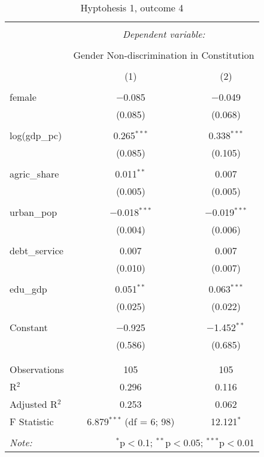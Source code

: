 \documentclass[12pt]{article}
\begin{document}
\begin{table}[!htbp] \centering 
  \caption{Hyptohesis 1, outcome 4} 
  \label{} 
\begin{tabular}{@{\extracolsep{5pt}}lcc} 
\\[-1.8ex]\hline 
\hline \\[-1.8ex] 
 & \multicolumn{2}{c}{\textit{Dependent variable:}} \\ 
\cline{2-3} 
\\[-1.8ex] & \multicolumn{2}{c}{Gender Non-discrimination in Constitution} \\ 
\\[-1.8ex] & (1) & (2)\\ 
\hline \\[-1.8ex] 
 female & $-$0.085 & $-$0.049 \\ 
  & (0.085) & (0.068) \\ 
  & & \\ 
 log(gdp\_pc) & 0.265$^{***}$ & 0.338$^{***}$ \\ 
  & (0.085) & (0.105) \\ 
  & & \\ 
 agric\_share & 0.011$^{**}$ & 0.007 \\ 
  & (0.005) & (0.005) \\ 
  & & \\ 
 urban\_pop & $-$0.018$^{***}$ & $-$0.019$^{***}$ \\ 
  & (0.004) & (0.006) \\ 
  & & \\ 
 debt\_service & 0.007 & 0.007 \\ 
  & (0.010) & (0.007) \\ 
  & & \\ 
 edu\_gdp & 0.051$^{**}$ & 0.063$^{***}$ \\ 
  & (0.025) & (0.022) \\ 
  & & \\ 
 Constant & $-$0.925 & $-$1.452$^{**}$ \\ 
  & (0.586) & (0.685) \\ 
  & & \\ 
\hline \\[-1.8ex] 
Observations & 105 & 105 \\ 
R$^{2}$ & 0.296 & 0.116 \\ 
Adjusted R$^{2}$ & 0.253 & 0.062 \\ 
F Statistic & 6.879$^{***}$ (df = 6; 98) & 12.121$^{*}$ \\ 
\hline 
\hline \\[-1.8ex] 
\textit{Note:}  & \multicolumn{2}{r}{$^{*}$p$<$0.1; $^{**}$p$<$0.05; $^{***}$p$<$0.01} \\ 
\end{tabular} 
\end{table}
\end{document}
